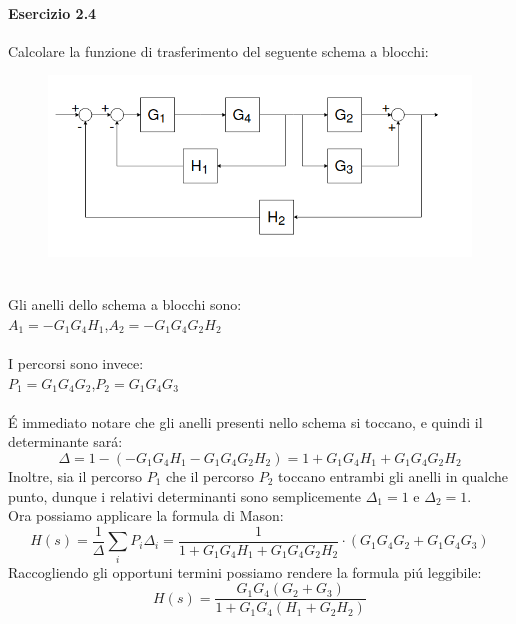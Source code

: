 \documentclass[12pt,a4paper]{article}
\begin{document}
	\paragraph*{Esercizio 2.4}
	Calcolare la funzione di trasferimento del seguente schema a blocchi:
	\begin{figure}[h!]
		\centering
		\includegraphics[scale=0.5]{./images/schema24.png}
	\end{figure}
	\\
	Gli anelli dello schema a blocchi sono:\\
	$A_1 = -G_1G_4H_1$,\quad$A_2 = -G_1G_4G_2H_2$\\ \\
	I percorsi sono invece:\\
	$P_1 = G_1G_4G_2$,\quad$P_2 = G_1G_4G_3$\\ \\
	\'E immediato notare che gli anelli presenti nello schema si toccano, e quindi il determinante sar\'a:
	\[
		\Delta = 1 - (-G_1G_4H_1 - G_1G_4G_2H_2) = 1 +G_1G_4H_1 + G_1G_4G_2H_2
	\]
	Inoltre, sia il percorso $P_1$ che il percorso $P_2$ toccano entrambi gli anelli in qualche punto, dunque i relativi determinanti sono semplicemente $\Delta_1 = 1$ e $\Delta_2 = 1$.\\
	Ora possiamo applicare la formula di Mason:
	\[
		H(s) = \frac{1}{\Delta}\sum_i P_i \Delta_i = \frac{1}{1 +G_1G_4H_1 + G_1G_4G_2H_2} \cdot \left(G_1G_4G_2 + G_1G_4G_3\right)
	\]
	Raccogliendo gli opportuni termini possiamo rendere la formula pi\'u leggibile:
	\[
		H(s) = \frac{G_1G_4(G_2+G_3)}{1+G_1G_4(H_1+G_2H_2)}
	\]
	\newpage
\end{document}
